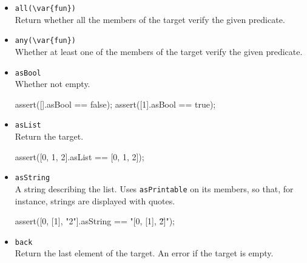 \begin{itemize}
\item \lstinline|all(\var{fun})|\\
Return whether all the members of the target verify the given
predicate.


\item \lstinline|any(\var{fun})|\\
  Whether at least one of the members of the target verify the given
  predicate.


\item \lstinline|asBool|\\
  Whether not empty.
\begin{urbiscript}[firstnumber=last]
assert([].asBool == false);
assert([1].asBool == true);
\end{urbiscript}

\item \lstinline|asList|\\
Return the target.

\begin{urbiscript}[firstnumber=last]
assert([0, 1, 2].asList == [0, 1, 2]);
\end{urbiscript}

\item \lstinline|asString|\\
  A string describing the list.  Uses \lstinline|asPrintable| on its
  members, so that, for instance, strings are displayed with quotes.

\begin{urbiscript}[firstnumber=last]
assert([0, [1], "2"].asString == "[0, [1], \"2\"]");
\end{urbiscript}

\item \lstinline|back|\\
Return the last element of the target. An error if the target is empty.


\end{itemize}
